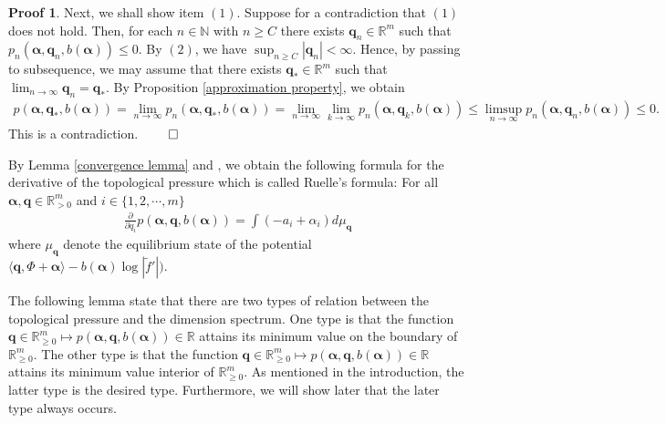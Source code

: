 \documentclass{article}
\theoremstyle{definition}
\newtheorem*{pf}{Proof}
\begin{document}
\begin{pf}
Next, we shall show item $(1)$. Suppose for a contradiction that $(1)$ does not hold. Then, for each $n\in\mathbb{N}$ with $n\geq C$ there exists $\boldsymbol{q}_n\in\mathbb{R}^m$ such that $p_{n}(\boldsymbol{\alpha},\boldsymbol{q}_n,b(\boldsymbol{\alpha}))\leq0$. By $(2)$, we have $\sup_{n\geq C}|\boldsymbol{q}_n|<\infty$. Hence, by passing to subsequence, we may assume that there exists $\boldsymbol{q}_*\in\mathbb{R}^m$ such that $\lim_{n\to\infty}\boldsymbol{q}_n=\boldsymbol{q}_*$. By Proposition \ref{approximation property}, we obtain
\begin{align*}
    p(\boldsymbol{\alpha},\boldsymbol{q}_*,b(\boldsymbol{\alpha}))=\lim_{n\to\infty}p_{n}(\boldsymbol{\alpha},\boldsymbol{q}_*,b(\boldsymbol{\alpha}))
    =\lim_{n\to\infty}\lim_{k\to\infty}p_{n}(\boldsymbol{\alpha},\boldsymbol{q}_k,b(\boldsymbol{\alpha}))\leq\limsup_{n\to\infty}p_{n}(\boldsymbol{\alpha},\boldsymbol{q}_n,b(\boldsymbol{\alpha}))\leq0.
\end{align*}
This is a contradiction.
$\qed$

\end{pf}





   By Lemma \ref{convergence lemma} and \cite[Proposition 2.6.12]{mauldin2003graph}, we obtain the following formula for   the derivative of the  topological pressure which is called Ruelle's formula: For all $\boldsymbol{\alpha},\boldsymbol{q}\in\mathbb{R}^m_{>0}$ and $i\in\{1,2,\cdots,m\}$ 
   \begin{align}\label{ruelle's formula first}
   \frac{\partial}{\partial q_i}p(\boldsymbol{\alpha},\boldsymbol{q},b(\boldsymbol{\alpha}))=\int(-a_i+\alpha_i)d\mu_{\boldsymbol{q}}
   \end{align}
   where $\mu_{\boldsymbol{q}}$ denote the equilibrium state of the potential $\langle\boldsymbol{q},\Phi+\boldsymbol{\alpha}\rangle-b(\boldsymbol{\alpha})\log|\tilde f'|)$. 

   
   
   The following lemma state that there are two types of relation between the topological pressure and the dimension spectrum. One type is that the function $\boldsymbol{q}\in\mathbb{R}^m_{\geq 0}\mapsto p(\boldsymbol{\alpha},\boldsymbol{q},b(\boldsymbol{\alpha}))\in\mathbb{R}$ attains its minimum value on the boundary of $\mathbb{R}_{\geq 0}^m$. The other type is that the function $\boldsymbol{q}\in\mathbb{R}^m_{\geq 0}\mapsto p(\boldsymbol{\alpha},\boldsymbol{q},b(\boldsymbol{\alpha}))\in\mathbb{R}$ attains its minimum value interior of $\mathbb{R}_{\geq 0}^m$. As mentioned in the introduction, the latter type is the desired type. Furthermore, we will show later that the later type always occurs.
\end{document}
